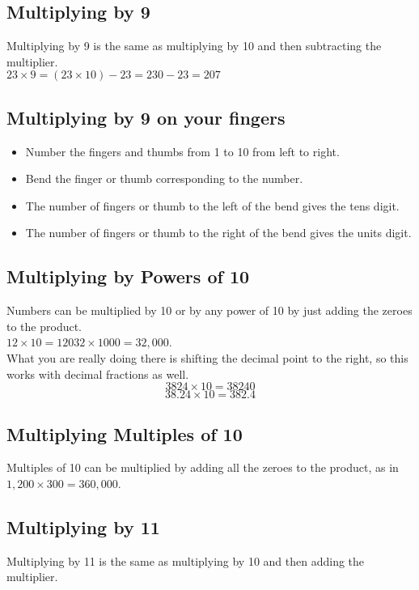 \documentclass{article}
\begin{document}
\begin{spacing}{1.25}
\subsection*{Multiplying by 9}
Multiplying by 9 is the same as multiplying by 10 and then subtracting the multiplier.\\

$23 \times 9 = (23 \times 10) - 23 = 230 - 23 = 207$

\subsection*{Multiplying by 9 on your fingers}

\begin{itemize}
\item Number the fingers and thumbs from 1 to 10 from left to right.
\item Bend the finger or thumb corresponding to the number.
\item The number of fingers or thumb to the left of the bend gives the tens digit.
\item The number of fingers or thumb to the right of the bend gives the units digit.
\end{itemize}

\subsection*{Multiplying by Powers of 10}

Numbers can be multiplied by 10 or by any power of 10 by just adding the zeroes to the product.\\

$12 \times 10 = 120$\hspace{2em}$32 \times 1000 = 32,000$.\\

What you are really doing there is shifting the decimal point to the right, so this works with decimal fractions as well.
$$3824 \times 10 = 38240$$
$$38.24 \times 10 = 382.4$$

\subsection*{Multiplying Multiples of 10}

Multiples of 10 can be multiplied by adding all the zeroes to the product, as in $1,200 \times 300 = 360,000$.

\subsection*{Multiplying by 11}
Multiplying by 11 is the same as multiplying by 10 and then adding the multiplier.\\


\end{spacing}
\end{document}

